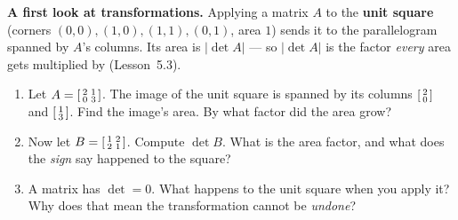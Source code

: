 \documentclass[10pt]{article}
\begin{document}
\begin{tcolorbox}[colback=white, colframe=black!40, title=\textbf{Tier E --- Extension},
    fonttitle=\bfseries, arc=1.5mm, left=3mm, right=3mm, top=2mm, bottom=2mm, breakable]
\textbf{A first look at transformations.} Applying a matrix $A$ to the \textbf{unit square} (corners
$(0,0),(1,0),(1,1),(0,1)$, area $1$) sends it to the parallelogram spanned by $A$'s columns. Its area
is $|\det A|$ --- so $|\det A|$ is the factor \emph{every} area gets multiplied by (Lesson~5.3).
\begin{enumerate}[leftmargin=1.7em, itemsep=9pt]
  \item Let $A=\begin{bsmallmatrix} 2 & 1\\ 0 & 3 \end{bsmallmatrix}$. The image of the unit square is
        spanned by its columns $\begin{bsmallmatrix} 2\\0 \end{bsmallmatrix}$ and
        $\begin{bsmallmatrix} 1\\3 \end{bsmallmatrix}$. Find the image's area. By what factor did the
        area grow? 
  \item Now let $B=\begin{bsmallmatrix} 1 & 2\\ 2 & 1 \end{bsmallmatrix}$. Compute $\det B$. What is the
        area factor, and what does the \emph{sign} say happened to the square? 
  \item A matrix has $\det=0$. What happens to the unit square when you apply it? Why does that mean
        the transformation cannot be \emph{undone}? 
\end{enumerate}
\end{tcolorbox}
\end{document}

